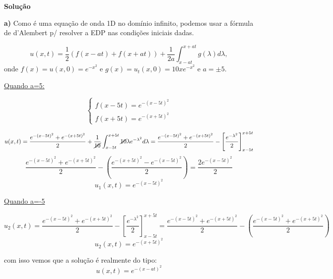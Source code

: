 \linespread{1.5}

\textbf{Solução}

\textbf{a)}
Como é uma equação de onda 1D no domínio infinito, podemos usar a fórmula de d'Alembert p/ resolver a EDP nas condições iniciais dadas.

\begin{equation*}
    u(x,t) = \frac{1}{2}(f(x-at)+f(x+at)) + \frac{1}{2a}\int_{x-at}^{x+at} g(\lambda)d\lambda,
\end{equation*}
onde $f(x) = u(x,0) = e^{-x^2}$ e $g(x) = u_t(x,0) = 10xe^{-x^2}$ e $a = \pm 5$.

\underline{Quando a=5:}

\begin{equation*}
    \begin{cases}
        f(x-5t) = e^{-(x-5t)^2}\\
        f(x+5t) = e^{-(x+5t)^2}
    \end{cases}
\end{equation*}

\begin{equation*}
    u(x,t) = \frac{e^{-(x-5t)^2}+e^{-(x+5t)^2}}{2} + \frac{1}{\cancel{10}}\int_{x-5t}^{x+5t} \cancel{10}\lambda e^{-\lambda^2}d\lambda = \frac{e^{-(x-5t)^2}+e^{-(x+5t)^2}}{2} - \left[\frac{e^{-\lambda^2}}{2}\right]_{x-5t}^{x+5t} 
\end{equation*}
\begin{equation*}
    \frac{e^{-(x-5t)^2}+e^{-(x+5t)^2}}{2} - \left(\frac{e^{-(x+5t)^2}-e^{-(x-5t)^2}}{2}\right) = \frac{2e^{-(x-5t)^2}}{2}
\end{equation*}
\begin{equation*}
    u_1(x,t) = e^{-(x-5t)^2}
\end{equation*}

\underline{Quando a=-5}

\begin{equation*}
    u_2(x,t) = \frac{e^{-(x-5t)^2}+e^{-(x+5t)^2}}{2} - \left[\frac{e^{-\lambda^2}}{2}\right]_{x-5t}^{x+5t} = \frac{e^{-(x-5t)^2}+e^{-(x+5t)^2}}{2} - \left(\frac{e^{-(x-5t)^2}+e^{-(x+5t)^2}}{2}\right) 
\end{equation*}
\begin{equation*}
    u_2(x,t) = e^{-(x+5t)^2}
\end{equation*}

com isso vemos que a solução é realmente do tipo:
\begin{equation*}
    u(x,t) = e^{-(x-at)^2}
\end{equation*}

